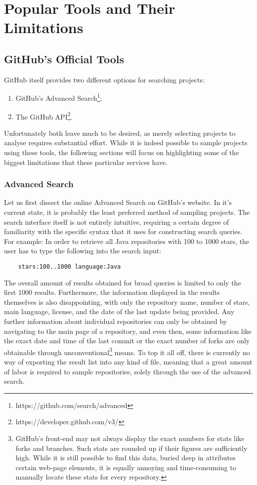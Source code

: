 \chapter{Popular Tools and Their Limitations}

\section{GitHub's Official Tools}

GitHub itself provides two different options for searching projects:
\begin{enumerate}
    \item GitHub's Advanced Search\footnote{https://github.com/search/advanced};
    \item The GitHub API\footnote{https://developer.github.com/v3/}\@.
\end{enumerate}
Unfortunately both leave much to be desired, as merely selecting projects to analyse requires substantial effort.
While it is indeed possible to sample projects using these tools, the following sections will focus on highlighting some of the biggest limitations that these particular services have.

\subsection{Advanced Search}

Let us first dissect the online Advanced Search on GitHub's website.
In it's current state, it is probably the least preferred method of sampling projects.
The search interface itself is not entirely intuitive, requiring a certain degree of familiarity with the specific syntax that it uses for constructing search queries.
For example: In order to retrieve all Java repositories with 100 to 1000 stars, the user has to type the following into the search input:
\begin{verbatim}
    stars:100..1000 language:Java
\end{verbatim}
The overall amount of results obtained for broad queries is limited to only the first 1000 results.
Furthermore, the information displayed in the results themselves is also disappointing, with only the repository name, number of stars, main language, license, and the date of the last update being provided.
Any further information about individual repositories can only be obtained by navigating to the main page of a repository, and even then, some information like the exact date and time of the last commit or the exact number of forks are only obtainable through unconventional\footnote{GitHub's front-end may not always display the exact numbers for stats like forks and branches.
Such stats are rounded up if their figures are sufficiently high.
While it is still possible to find this data, buried deep in attributes certain web-page elements, it is equally annoying and time-consuming to manually locate these stats for every repository.} means.
To top it all off, there is currently no way of exporting the result list into any kind of file, meaning that a great amount of labor is required to sample repositories, solely through the use of the advanced search.

